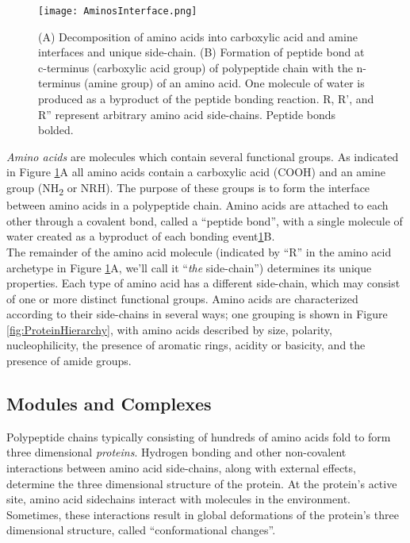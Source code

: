 {%


\begin{figure}
  \texttt{[image: AminosInterface.png]}
  \caption{(A) Decomposition of amino acids into carboxylic acid and amine interfaces and unique side-chain. (B) Formation of peptide bond at c-terminus (carboxylic acid group) of polypeptide chain with the n-terminus (amine group) of an amino acid. One molecule of water is produced as a byproduct of the peptide bonding reaction.  R, R', and R'' represent arbitrary amino acid side-chains.  Peptide bonds bolded.}
  \label{fig:AminosInterface}
\end{figure}

\textit{Amino acids} are molecules which contain several functional groups.  As indicated in Figure \ref{fig:AminosInterface}A all amino acids contain a carboxylic acid (COOH) and an amine group (NH\textsubscript{2} or NRH).  The purpose of these groups is to form the interface between amino acids in a polypeptide chain.  Amino acids are attached to each other through a covalent bond, called a ``peptide bond'', with a single molecule of water created as a byproduct of each bonding event\ref{fig:AminosInterface}B.\\

The remainder of the amino acid molecule (indicated by ``R'' in the amino acid archetype in Figure \ref{fig:AminosInterface}A, we'll call it ``\textit{the} side-chain'') determines its unique properties.  Each type of amino acid has a different side-chain, which may consist of one or more distinct functional groups.  Amino acids are characterized according to their side-chains in several ways; one grouping is shown in Figure \ref{fig:ProteinHierarchy}, with amino acids described by size, polarity, nucleophilicity, the presence of aromatic rings, acidity or basicity, and the presence of amide groups.\\

 \subsection{Modules and Complexes}

Polypeptide chains typically consisting of hundreds of amino acids fold to form three dimensional \textit{proteins}.  Hydrogen bonding and other non-covalent interactions between amino acid side-chains, along with external effects, determine the three dimensional structure of the protein.  At the protein's active site, amino acid sidechains interact with molecules in the environment.  Sometimes, these interactions result in global deformations of the protein's three dimensional structure, called ``conformational changes''.\\

}
